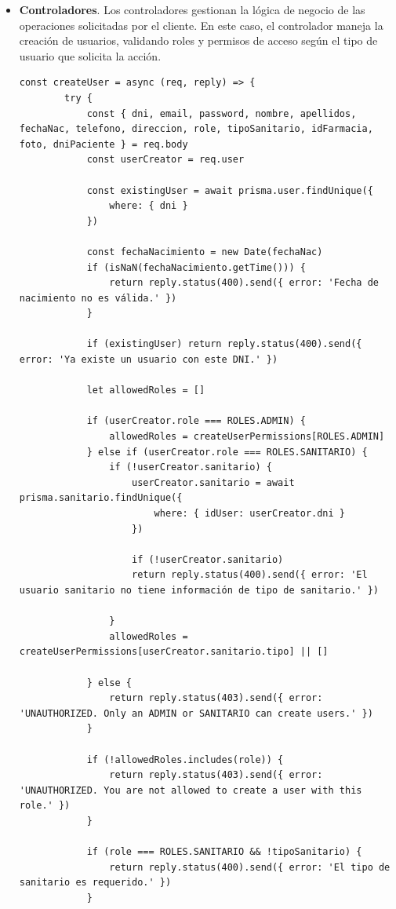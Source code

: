 \begin{itemize}
	\item \textbf{Controladores}. Los controladores gestionan la lógica de negocio de las operaciones solicitadas por el cliente. En este caso, el controlador maneja la creación de usuarios, validando roles y permisos de acceso según el tipo de usuario que solicita la acción.

\begin{lstlisting}[caption={Ejemplo de controlador para crear un usuario}, label={lst:createUser}]
	const createUser = async (req, reply) => {
		try {
			const { dni, email, password, nombre, apellidos, fechaNac, telefono, direccion, role, tipoSanitario, idFarmacia, foto, dniPaciente } = req.body
			const userCreator = req.user
			
			const existingUser = await prisma.user.findUnique({
				where: { dni }
			})
			
			const fechaNacimiento = new Date(fechaNac)
			if (isNaN(fechaNacimiento.getTime())) {
				return reply.status(400).send({ error: 'Fecha de nacimiento no es válida.' })
			}
			
			if (existingUser) return reply.status(400).send({ error: 'Ya existe un usuario con este DNI.' })
			
			let allowedRoles = []
			
			if (userCreator.role === ROLES.ADMIN) {
				allowedRoles = createUserPermissions[ROLES.ADMIN]
			} else if (userCreator.role === ROLES.SANITARIO) {
				if (!userCreator.sanitario) {
					userCreator.sanitario = await prisma.sanitario.findUnique({
						where: { idUser: userCreator.dni }
					})
					
					if (!userCreator.sanitario) 
					return reply.status(400).send({ error: 'El usuario sanitario no tiene información de tipo de sanitario.' })
					
				}
				allowedRoles = createUserPermissions[userCreator.sanitario.tipo] || []
				
			} else {
				return reply.status(403).send({ error: 'UNAUTHORIZED. Only an ADMIN or SANITARIO can create users.' })
			}
			
			if (!allowedRoles.includes(role)) {
				return reply.status(403).send({ error: 'UNAUTHORIZED. You are not allowed to create a user with this role.' })
			}
			
			if (role === ROLES.SANITARIO && !tipoSanitario) {
				return reply.status(400).send({ error: 'El tipo de sanitario es requerido.' })
			}
			

\end{lstlisting}
\end{itemize}
